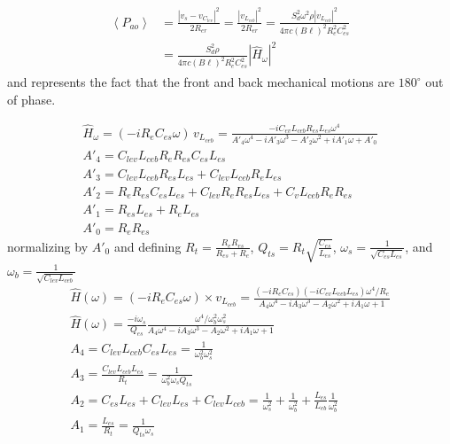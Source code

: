 \documentclass[10pt]{book}
\begin{document}
\begin{align}
\begin{split}
\left\langle P_{ao} \right\rangle &=\frac{\left| v_s -v_{C_{lev}} \right|^2}{2R_{er}}=\frac{\left| v_{L_{ceb}} \right|^2}{2R_{er}}=\frac{S_d^2 \omega^2 \rho\left| v_{L_{ceb}} \right|^2}{4\pi c (B \ell)^2R_{e}^2C_{es}^2}\\
&=\frac{S_d^2 \rho}{4\pi c (B \ell)^2R_{e}^2C_{es}^2}\left| \hat{H}_\omega \right|^2
\end{split}
\end{align}
and represents the fact that the front and back mechanical motions are $180^\circ$ out of phase.



\begin{align}
\hat{H}_\omega=(-i R_e C_{es} \omega) \, v_{L_{ceb}}= \frac{
-i  C_{ev} L_{ceb} R_{es} L_{es} \omega^4}
{A'_4\omega^4-iA'_3\omega^3-A'_2\omega^2+iA'_1\omega+A'_0}\\
A'_4=C_{lev} L_{ceb} R_e R_{es}  C_{es} L_{es}\\
A'_3=C_{lev} L_{ceb} R_{es} L_{es}
+ C_{lev} L_{ceb} R_e L_{es}\\
A'_2=R_e R_{es}  C_{es} L_{es}+C_{lev} R_e R_{es} L_{es}+C_v L_{ceb} R_e R_{es}\\
A'_1=R_{es} L_{es}+R_e L_{es}\\
A'_0=R_e R_{es}
\end{align}
normalizing by $A'_0$ and defining $R_t=\frac{R_eR_{es}}{R_{es}+R_e}$, $Q_{ts}=R_t\sqrt{\frac{C_{es}}{L_{es}}}$, $\omega_s=\frac{1}{\sqrt{C_{es}L_{es}}}$, and $\omega_b=\frac{1}{\sqrt{C_{lev}L_{ceb}}}$
\begin{align}
\hat{H}(\omega)=(-i R_e C_{es}\omega) \times v_{L_{ceb}}= \frac{
(-i R_e C_{es})(-i  C_{ev} L_{ceb} L_{es}) \omega^4/R_e}
{A_4\omega^4-iA_3\omega^3-A_2\omega^2+iA_1\omega+1}\\
\hat{H}(\omega)= \frac{-i\omega_s}{Q_{es}}\frac{\omega^4/\omega_b^2 \omega_s^2}
{A_4\omega^4-iA_3\omega^3-A_2\omega^2+iA_1\omega+1}\\
A_4=C_{lev} L_{ceb} C_{es} L_{es}=\frac{1}{\omega_b^2\omega_s^2}\\
A_3=\frac{C_{lev} L_{ceb} L_{es}}{R_t}=\frac{1}{\omega_b^2\omega_s Q_{ts}}\\
A_2=C_{es} L_{es}+C_{lev} L_{es}+C_{lev} L_{ceb}=\frac{1}{\omega_s^2}+\frac{1}{\omega_b^2}+\frac{L_{es}}{L_{eb}}\frac{1}{\omega_b^2}\\
A_1=\frac{L_{es}}{R_t}=\frac{1}{Q_{ts}\omega_s}
\end{align}
\end{document}
